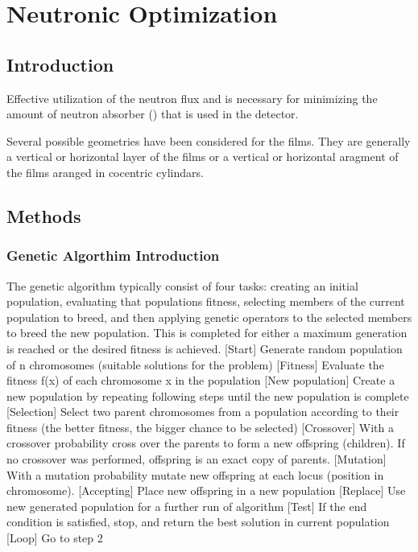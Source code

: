 \chapter{Neutronic Optimization}
\label{ch:GAOpt}
\section{Introduction}
Effective utilization of the neutron flux and is necessary for minimizing the amount of neutron absorber () that is used in the detector.

Several possible geometries have been considered for the films. 
They are generally a vertical or horizontal layer of the films or a vertical or horizontal aragment of the films aranged in cocentric cylindars.
\section{Methods}

\subsection{Genetic Algorthim Introduction}
The genetic algorithm typically consist of four tasks: creating an initial population, evaluating that populations fitness, selecting members of the current population to breed, and then applying genetic operators to the selected members to breed the new population. 
This is completed for either a maximum generation is reached or the desired fitness is achieved. 
[Start] Generate random population of n chromosomes (suitable solutions for the problem)
[Fitness] Evaluate the fitness f(x) of each chromosome x in the population
[New population] Create a new population by repeating following steps until the new population is complete
[Selection] Select two parent chromosomes from a population according to their fitness (the better fitness, the bigger chance to be selected)
[Crossover] With a crossover probability cross over the parents to form a new offspring (children). If no crossover was performed, offspring is an exact copy of parents.
[Mutation] With a mutation probability mutate new offspring at each locus (position in chromosome).
[Accepting] Place new offspring in a new population
[Replace] Use new generated population for a further run of algorithm
[Test] If the end condition is satisfied, stop, and return the best solution in current population
[Loop] Go to step 2

